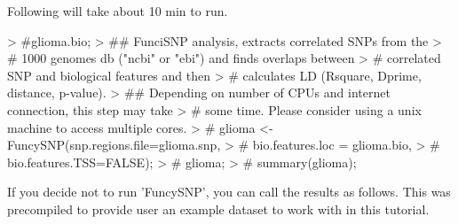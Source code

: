 \documentclass[a4paper]{article}
\begin{document}
Following will take about 10 min to run.
\begin{Schunk}
\begin{Sinput}
> #glioma.bio;
> ## FunciSNP analysis, extracts correlated SNPs from the 
> #  1000 genomes db ("ncbi" or "ebi") and finds overlaps between 
> #  correlated SNP and biological features and then 
> #  calculates LD (Rsquare, Dprime, distance, p-value).
> ## Depending on number of CPUs and internet connection, this step may take 
> # some time. Please consider using a unix machine to access multiple cores.
> # glioma <- FuncySNP(snp.regions.file=glioma.snp, 
> #           bio.features.loc = glioma.bio, 
> #           bio.features.TSS=FALSE);
> # glioma;
> # summary(glioma);
\end{Sinput}
\end{Schunk}
If you decide not to run 'FuncySNP', you can call the results as
 follows. This was precompiled to provide user an example dataset to work 
 with in this tutorial.
\end{document}
